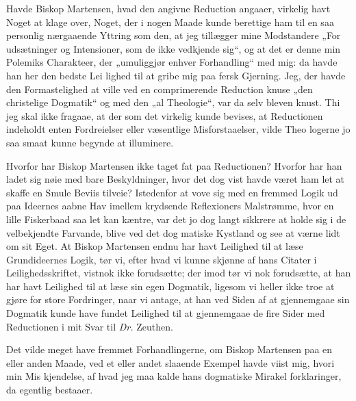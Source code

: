 \documentclass[12pt]{book}
\newcommand{\opage}[1]{\marginnote{\footnotesize\textit{[#1]}}}
\begin{document}
\opage{85}\setcounter{footnote}{0}%
Havde Biskop Martensen, hvad den angivne Reduction
angaaer, virkelig havt Noget at klage over, Noget, der i nogen
Maade kunde berettige ham til en saa personlig nærgaaende
Yttring som den, at jeg tillægger mine Modstandere „For\-%
udsætninger og Intensioner, som de ikke vedkjende sig“, og at
det er denne min Polemiks Charakteer, der „umuliggjør enhver
Forhandling“ med mig: da havde han her den bedste Lei\-%
lighed til at gribe mig paa fersk Gjerning. Jeg, der havde
den Formastelighed at ville ved en comprimerende Reduction
knuse „den christelige Dogmatik“ og med den „al Theologie“,
var da selv bleven knust. Thi jeg skal ikke fragaae, at der\-%
som det virkelig kunde bevises, at Reductionen indeholdt
enten Fordreielser eller væsentlige Misforstaaelser, vilde Theo\-%
logerne jo saa smaat kunne begynde at illuminere.

Hvorfor har Biskop Martensen ikke taget fat paa
Reductionen? Hvorfor har han ladet sig nøie med bare
Beskyldninger, hvor det dog vist havde været ham let at
skaffe en Smule Beviis tilveie? Istedenfor at vove sig
med en fremmed Logik ud paa Ideernes aabne Hav
imellem krydsende Reflexioners Malstrømme, hvor en lille
Fiskerbaad saa let kan kæntre, var det jo dog langt sikkrere
at holde sig i de velbekjendte Farvande, blive ved det dog\-%
matiske Kystland og see at værne lidt om sit Eget. At
Biskop Martensen endnu har havt Leilighed til at læse
Grundideernes Logik, tør vi, efter hvad vi kunne skjønne af
hans Citater i Leilighedsskriftet, vistnok ikke forudsætte; der\-%
imod tør vi nok forudsætte, at han har havt Leilighed til at
læse sin egen Dogmatik, ligesom vi heller ikke troe at gjøre for
store Fordringer, naar vi antage, at han ved Siden af at
gjennemgaae sin Dogmatik kunde have fundet Leilighed til at
gjennemgaae de fire Sider med Reductionen i mit Svar til
\textit{Dr.} Zeuthen.

Det vilde meget have fremmet Forhandlingerne, om
Biskop Martensen paa en eller anden Maade, ved et eller
\opage{86}\setcounter{footnote}{0}%
andet slaaende Exempel havde viist mig, hvori min Mis\-%
kjendelse, af hvad jeg maa kalde hans dogmatiske Mirakel\-%
forklaringer, da egentlig bestaaer.
\end{document}
